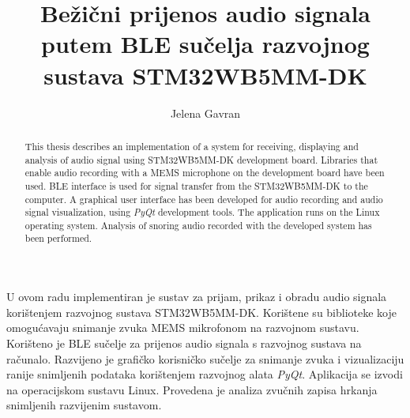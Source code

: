 \documentclass[times, utf8, zavrsni, numeric]{fer}
\renewcommand*\lstlistlistingname{Popis isječaka koda}
\begin{document}

\title{Bežični prijenos audio signala putem BLE sučelja razvojnog sustava STM32WB5MM-DK}

\author{Jelena Gavran}

\maketitle


\zahvala{}

\tableofcontents

\begingroup
\renewcommand*\listfigurename{Popis slika}
\listoffigures
\addcontentsline{toc}{chapter}{\lstlistlistingname}
\lstlistoflistings
\listoftables
\endgroup











{}


\begin{sazetak}
U ovom radu implementiran je sustav za prijam, prikaz i obradu audio signala korištenjem razvojnog sustava STM32WB5MM-DK. Korištene su biblioteke koje omogućavaju snimanje zvuka MEMS mikrofonom na razvojnom sustavu. Korišteno je BLE sučelje za prijenos audio signala s razvojnog sustava na računalo. Razvijeno je grafičko korisničko sučelje za snimanje zvuka i vizualizaciju ranije snimljenih podataka korištenjem razvojnog alata \textit{PyQt}. Aplikacija se izvodi na operacijskom sustavu Linux. Provedena je analiza zvučnih zapisa hrkanja snimljenih razvijenim sustavom. 

\end{sazetak}

\begin{abstract}
This thesis describes an implementation of a system for receiving, displaying and analysis of audio signal using STM32WB5MM-DK development board. Libraries that enable audio recording with a MEMS microphone on the development board have been used. BLE interface is used for signal transfer from the STM32WB5MM-DK to the computer. A graphical user interface has been developed for audio recording and audio signal visualization, using \textit{PyQt} development tools. The application runs on the Linux operating system. Analysis of snoring audio recorded with the developed system has been performed. 

\end{abstract}
\end{document}
